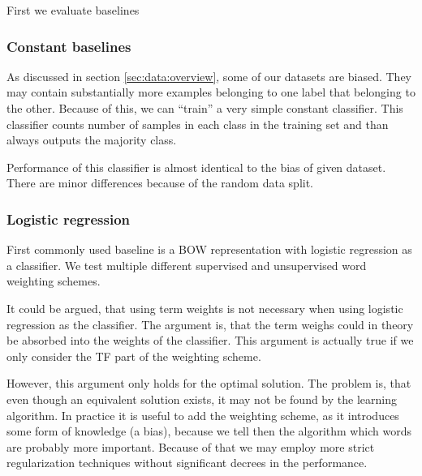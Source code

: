     First we evaluate baselines 
    \* %
    
    \subsubsection{Constant baselines}
    
    As discussed in section \ref{sec:data:overview}, some of our datasets are biased. 
    They may contain substantially more examples belonging to one label that belonging to the other.
    Because of this, we can ``train'' a very simple constant classifier. 
    This classifier counts number of samples in each class in the training set and than always outputs the majority class.
    
    Performance of this classifier is almost identical to the bias of given dataset. 
    There are minor differences because of the random data split. 

    \* %
    
    \subsubsection{Logistic regression}
    
    First commonly used baseline is a BOW representation with logistic regression as a classifier. 
    We test multiple different supervised and unsupervised word weighting schemes.
    
    It could be argued, that using term weights is not necessary when using logistic regression as the classifier.
    The argument is, that the term weighs could in theory be absorbed into the weights of the classifier. 
    This argument is actually true if we only consider the TF part of the weighting scheme.
    
    However, this argument only holds for the optimal solution. 
    The problem is, that even though an equivalent solution exists, it may not be found by the learning algorithm. 
    In practice it is useful to add the weighting scheme, 
    as it introduces some form of knowledge (a bias), 
    because we tell then the algorithm which words are probably more important.
    Because of that we may employ more strict regularization techniques without significant decrees in the performance.
    

